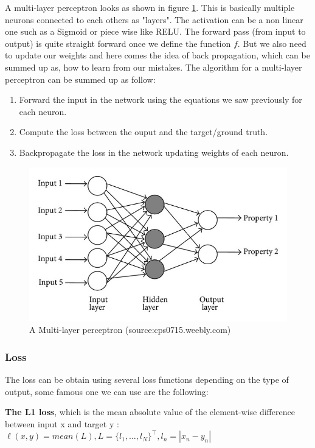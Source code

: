 A multi-layer perceptron looks as shown in figure \ref{fig:percp}. This is basically multiple neurons connected to each others as "layers". The activation can be a non linear one such as a Sigmoid or piece wise like RELU.
The forward pass (from input to output) is quite straight forward once we define the function $f$. But we also need to update our weights and here comes the idea of back propagation, which can be summed up as, how to learn from our mistakes. The algorithm for a multi-layer perceptron can be summed up as follow:
\begin{enumerate}
    \item Forward the input in the network using the equations we saw previously for each neuron.
    \item Compute the loss between the ouput and the target/ground truth.
    \item Backpropagate the loss in the network updating weights of each neuron.
\end{enumerate}

\begin{figure}[ht!]
   \centerline{\includegraphics[scale=2.0]{./pics/perceptron.jpeg}}
   \caption{A Multi-layer perceptron (source:cps0715.weebly.com)}
   \label{fig:percp}
\end{figure}

\subsubsection{Loss}

The loss can be obtain using several loss functions depending on the type of output, some famous one we can use are the following:

\textbf{The L1 loss}, which is the mean absolute value of the element-wise difference between input x and target y : $\ell(x, y) = mean(L), L = \{l_1,\dots,l_N\}^\top,  l_n = \left| x_n - y_n \right|$


